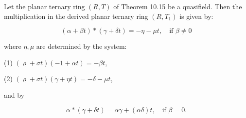 Let the planar ternary ring $(R, T)$ of Theorem 10.15 be a quasifield. Then the multiplication in the derived planar ternary ring $(R, T_1)$ is given by:

$$(\alpha + \beta t) * (\gamma + \delta t) = -\eta - \mu t, \quad \text{if } \beta \neq 0$$

where $\eta, \mu$ are determined by the system:

(1) $(\varrho + \sigma t)(-1 + \alpha t) = -\beta t$,

(2) $(\varrho + \sigma t)(\gamma + \eta t) = -\delta - \mu t$,

and by

$$\alpha * (\gamma + \delta t) = \alpha \gamma + (\alpha \delta) t, \quad \text{if } \beta = 0.$$
